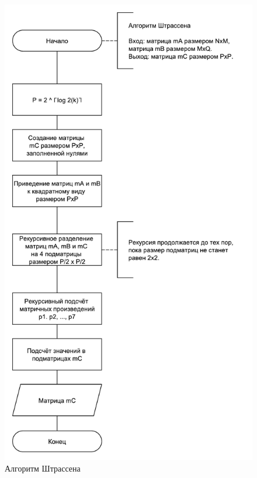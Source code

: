 \begin{figure}
	\centering
	\includegraphics[width=0.65\linewidth]{images/strassen}
	\caption{Алгоритм Штрассена}
	\label{fig:strassen}
\end{figure}

\newpage

